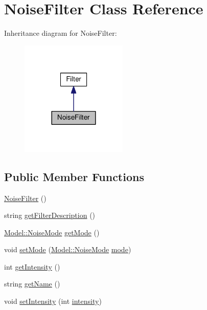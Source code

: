 \hypertarget{classModel_1_1NoiseFilter}{}\section{Noise\+Filter Class Reference}
\label{classModel_1_1NoiseFilter}


Inheritance diagram for Noise\+Filter\+:
\nopagebreak
\begin{figure}[H]
\begin{center}
\leavevmode
\includegraphics[width=144pt]{classModel_1_1NoiseFilter__inherit__graph}
\end{center}
\end{figure}
\subsection*{Public Member Functions}
\begin{DoxyCompactItemize}
\item 
\hyperlink{classModel_1_1NoiseFilter_ae0fddd4ce827a9428beb93c8fd39ea6a}{Noise\+Filter} ()
\item 
string \hyperlink{classModel_1_1NoiseFilter_a62b7b60e24f92234393b840b35808e06}{get\+Filter\+Description} ()
\item 
\hyperlink{namespaceModel_a0466e3095e9c21e5864d8964e9d7df59}{Model\+::\+Noise\+Mode} \hyperlink{classModel_1_1NoiseFilter_ab7a70a6b1910334e61531f5b65a4fa9a}{get\+Mode} ()
\item 
void \hyperlink{classModel_1_1NoiseFilter_acee86eb98b73f986b5e37610f6c3ab9c}{set\+Mode} (\hyperlink{namespaceModel_a0466e3095e9c21e5864d8964e9d7df59}{Model\+::\+Noise\+Mode} \hyperlink{classModel_1_1NoiseFilter_a0c65c7ea38f862aa144334b677f07a7c}{mode})
\item 
int \hyperlink{classModel_1_1NoiseFilter_a708995fb1b6acb31ee0dfb0f4881e5b5}{get\+Intensity} ()
\item 
string \hyperlink{classModel_1_1NoiseFilter_a11335e13e50af74108bf926dc1340b4b}{get\+Name} ()
\item 
void \hyperlink{classModel_1_1NoiseFilter_ac8255ffbc46bb61acaa8fd23d0d260eb}{set\+Intensity} (int \hyperlink{classModel_1_1NoiseFilter_a299ec0c42ccc5a2d79d1739428ac3210}{intensity})
\end{DoxyCompactItemize}
